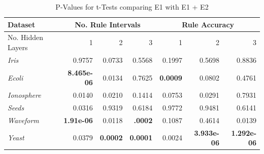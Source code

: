 \begin{table}[t!]
  \centering
  \begin{tabular}{|l|r|r|r|r|r|r|}
    \hline
    Dataset & 
    \multicolumn{3}{c|}{No. Rule Intervals} &
    \multicolumn{3}{c|}{Rule Accuracy} \\
    \cline{2-7}
    \hline
    No. Hidden Layers & 1 & 2 & 3 & 1 & 2 & 3 \\
    \hline
    \textit{Iris} & 0.9757 & 0.0733 & 0.5568 & 0.1997 & 0.5698 & 0.8836 \\
    \textit{Ecoli} & \textbf{8.465e-06} & 0.0134 & 0.7625 &\textbf{0.0009} & 0.0802 & 0.4761 \\
    \textit{Ionosphere} & 0.0140& 0.0210& 0.1414&0.0753 & 0.0291& 0.7931\\
    \textit{Seeds} & 0.0316 & 0.9319 & 0.6184 &0.9772 & 0.9481 & 0.6141 \\
    \textit{Waveform} & \textbf{1.91e-06}& 0.0118& \textbf{.0002} & 0.1087 & 0.4614 &0.0139\\
    \textit{Yeast} &0.0379 &\textbf{0.0002}&\textbf{0.0001}&0.0024 & \textbf{3.933e-06}& \textbf{1.292e-06}\\
    \hline
  \end{tabular}
  \caption{P-Values for t-Tests comparing E1 with E1 + E2}
  \label{tab:pval_results}  
\end{table}
